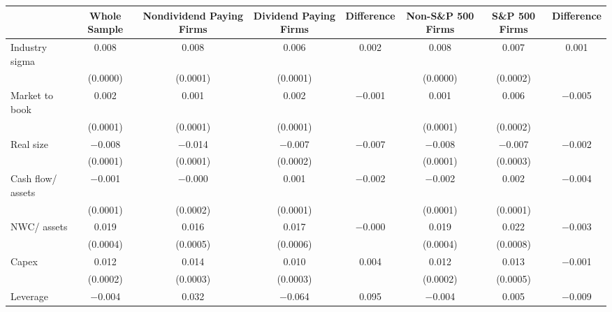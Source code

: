 \begin{tabular}{l*{7}{c}}
\toprule
                    &\multicolumn{1}{p{2cm}}{\centering Whole Sample}&\multicolumn{1}{p{2cm}}{\centering Nondividend Paying Firms}&\multicolumn{1}{p{2cm}}{\centering Dividend Paying Firms}&\multicolumn{1}{p{2cm}}{\centering Difference}&\multicolumn{1}{p{2cm}}{\centering Non-S\&P 500 Firms}&\multicolumn{1}{p{2cm}}{\centering S\&P 500 Firms}&\multicolumn{1}{p{2cm}}{\centering Difference}\\
\midrule
Industry sigma      &       0.008&       0.008&       0.006&       0.002&       0.008&       0.007&       0.001\\
                    &    (0.0000)&    (0.0001)&    (0.0001)&            &    (0.0000)&    (0.0002)&            \\
\addlinespace
Market to book      &       0.002&       0.001&       0.002&    $-$0.001&       0.001&       0.006&    $-$0.005\\
                    &    (0.0001)&    (0.0001)&    (0.0001)&            &    (0.0001)&    (0.0002)&            \\
\addlinespace
Real size           &    $-$0.008&    $-$0.014&    $-$0.007&    $-$0.007&    $-$0.008&    $-$0.007&    $-$0.002\\
                    &    (0.0001)&    (0.0001)&    (0.0002)&            &    (0.0001)&    (0.0003)&            \\
\addlinespace
Cash flow/ assets   &    $-$0.001&    $-$0.000&       0.001&    $-$0.002&    $-$0.002&       0.002&    $-$0.004\\
                    &    (0.0001)&    (0.0002)&    (0.0001)&            &    (0.0001)&    (0.0001)&            \\
\addlinespace
NWC/ assets         &       0.019&       0.016&       0.017&    $-$0.000&       0.019&       0.022&    $-$0.003\\
                    &    (0.0004)&    (0.0005)&    (0.0006)&            &    (0.0004)&    (0.0008)&            \\
\addlinespace
Capex               &       0.012&       0.014&       0.010&       0.004&       0.012&       0.013&    $-$0.001\\
                    &    (0.0002)&    (0.0003)&    (0.0003)&            &    (0.0002)&    (0.0005)&            \\
\addlinespace
Leverage            &    $-$0.004&       0.032&    $-$0.064&       0.095&    $-$0.004&       0.005&    $-$0.009\\

\end{tabular}
